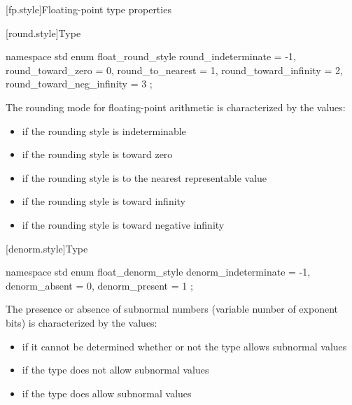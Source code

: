 [fp.style]{Floating-point type properties}

[round.style]{Type }

%
\begin{codeblock}
namespace std {
  enum float_round_style {
    round_indeterminate       = -1,
    round_toward_zero         =  0,
    round_to_nearest          =  1,
    round_toward_infinity     =  2,
    round_toward_neg_infinity =  3
  };
}
\end{codeblock}

\pnum
The rounding mode for floating-point arithmetic is characterized by the
values:
\begin{itemize}
\item
{}%
if the rounding style is indeterminable
\item
{}%
if the rounding style is toward zero
\item
{}%
if the rounding style is to the nearest representable value
\item
{}%
if the rounding style is toward infinity
\item
{}%
if the rounding style is toward negative infinity
\end{itemize}

[denorm.style]{Type }

%
\begin{codeblock}
namespace std {
  enum float_denorm_style {
    denorm_indeterminate = -1,
    denorm_absent = 0,
    denorm_present = 1
  };
}
\end{codeblock}

%
%
%
%
\pnum
The presence or absence of subnormal numbers (variable number of exponent bits)
is characterized by the values:
\begin{itemize}
\item
{}%
if it cannot be determined whether or not the type allows subnormal values
\item
{}%
if the type does not allow subnormal values
\item
{}%
if the type does allow subnormal values
\end{itemize}

